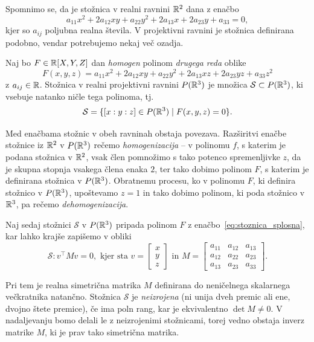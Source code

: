 Spomnimo se, da je stožnica v realni ravnini $\mathbb R^2$ dana z enačbo
$$a_{11}x^2 + 2a_{12}xy + a_{22}y^2 + 2a_{13}x + 2a_{23}y + a_{33} = 0,$$
kjer so $a_{ij}$ poljubna realna števila. V projektivni ravnini je stožnica definirana podobno, vendar potrebujemo nekaj več ozadja.
\begin{definicija}
    Naj bo $F \in \mathbb R[X,Y,Z]$ dan \emph{homogen} polinom \emph{drugega reda} oblike
    \begin{equation}
        \label{eq:stoznica_splosna}
        F(x,y,z) = a_{11}x^2 + 2a_{12}xy + a_{22}y^2 + 2a_{13}xz + 2a_{23}yz + a_{33}z^2
    \end{equation}
    z $a_{ij} \in \mathbb R$. Stožnica v realni projektivni ravnini $P(\mathbb R^3)$ je množica $\mathcal{S} \subset P(\mathbb R^3)$, ki vsebuje natanko ničle tega polinoma, tj.
    $$ \mathcal{S} = \{[x:y:z] \in P(\mathbb R^3) \; | \; F(x,y,z) = 0\}.$$  
\end{definicija}
\begin{opomba}
    Med enačbama stožnic v obeh ravninah obstaja povezava. Razširitvi enačbe stožnice iz $\mathbb R^2$ v $P(\mathbb R^3)$ rečemo \emph{homogenizacija} -- v polinomu $f$, s katerim je podana stožnica v $\mathbb R^2$, vsak člen pomnožimo s tako potenco spremenljivke $z$, da je skupna stopnja vsakega člena enaka $2$, ter tako dobimo polinom $F$, s katerim je definirana stožnica v $P(\mathbb R^3)$. Obratnemu procesu, ko v polinomu $F$, ki definira stožnico v $P(\mathbb R^3)$, upoštevamo $z=1$ in tako dobimo polinom, ki poda stožnico v $\mathbb R^3$, pa rečemo \emph{dehomogenizacija}.
\end{opomba}

Naj sedaj stožnici $\mathcal{S}$ v $P(\mathbb R^3)$ pripada polinom $F$ z enačbo~\eqref{eq:stoznica_splosna}, kar lahko krajše zapišemo v obliki
\begin{equation}
    \label{eq:stoznica_matricna}
    \mathcal{S}: v^\intercal M v = 0,
    \text{ kjer sta } v =
    \begin{bmatrix}
        x\\
        y\\
        z
    \end{bmatrix}
    \text{ in } M =
    \begin{bmatrix}
        a_{11} & a_{12} & a_{13}\\
        a_{12} & a_{22} & a_{23}\\
        a_{13} & a_{23} & a_{33}
    \end{bmatrix}.
\end{equation}

Pri tem je realna simetrična matrika $M$ definirana do neničelnega skalarnega večkratnika natančno. Stožnica $\mathcal{S}$ je \emph{neizrojena} (ni unija dveh premic ali ene, dvojno štete premice), če ima poln rang, kar je ekvivalentno $\det M \neq 0$. V nadaljevanju bomo delali le z neizrojenimi stožnicami, torej vedno obstaja inverz matrike $M$, ki je prav tako simetrična matrika.

